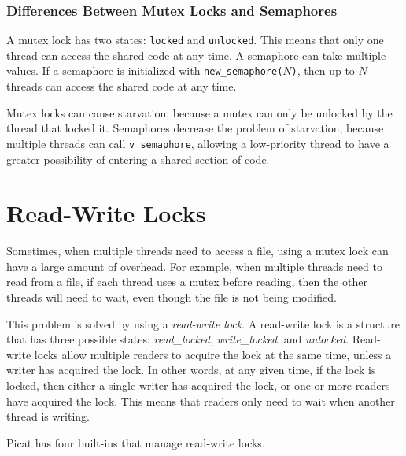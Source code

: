 \subsubsection{Differences Between Mutex Locks and Semaphores}
A mutex lock has two states: \texttt{locked} and \texttt{unlocked}.  This means that only one thread can access the shared code at any time.  A semaphore can take multiple values.  If a semaphore is initialized with \texttt{new\_semaphore($N$)}, then up to $N$ threads can access the shared code at any time.

Mutex locks can cause starvation, because a mutex can only be unlocked by the thread that locked it.  Semaphores decrease the problem of starvation, because multiple threads can call \texttt{v\_semaphore}, allowing a low-priority thread to have a greater possibility of entering a shared section of code.

\section{Read-Write Locks}
Sometimes, when multiple threads need to access a file, using a mutex lock can have a large amount of overhead.  For example, when multiple threads need to read from a file, if each thread uses a mutex before reading, then the other threads will need to wait, even though the file is not being modified.  

This problem is solved by using a \emph{read-write lock}.  A read-write lock is a structure that has three possible states: \emph{read\_locked}, \emph{write\_locked}, and \emph{unlocked}.  Read-write locks allow multiple readers to acquire the lock at the same time, unless a writer has acquired the lock.  In other words, at any given time, if the lock is locked, then either a single writer has acquired the lock, or one or more readers have acquired the lock.  This means that readers only need to wait when another thread is writing.

Picat has four built-ins that manage read-write locks.

